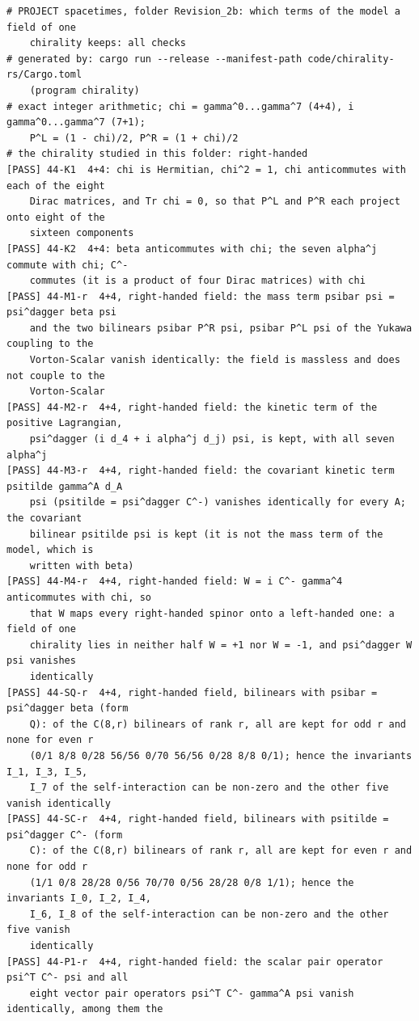 \documentclass[
  10pt,
]{article}
\begin{document}
\begin{verbatim}
# PROJECT spacetimes, folder Revision_2b: which terms of the model a field of one
    chirality keeps: all checks
# generated by: cargo run --release --manifest-path code/chirality-rs/Cargo.toml
    (program chirality)
# exact integer arithmetic; chi = gamma^0...gamma^7 (4+4), i gamma^0...gamma^7 (7+1);
    P^L = (1 - chi)/2, P^R = (1 + chi)/2
# the chirality studied in this folder: right-handed
[PASS] 44-K1  4+4: chi is Hermitian, chi^2 = 1, chi anticommutes with each of the eight
    Dirac matrices, and Tr chi = 0, so that P^L and P^R each project onto eight of the
    sixteen components
[PASS] 44-K2  4+4: beta anticommutes with chi; the seven alpha^j commute with chi; C^-
    commutes (it is a product of four Dirac matrices) with chi
[PASS] 44-M1-r  4+4, right-handed field: the mass term psibar psi = psi^dagger beta psi
    and the two bilinears psibar P^R psi, psibar P^L psi of the Yukawa coupling to the
    Vorton-Scalar vanish identically: the field is massless and does not couple to the
    Vorton-Scalar
[PASS] 44-M2-r  4+4, right-handed field: the kinetic term of the positive Lagrangian,
    psi^dagger (i d_4 + i alpha^j d_j) psi, is kept, with all seven alpha^j
[PASS] 44-M3-r  4+4, right-handed field: the covariant kinetic term psitilde gamma^A d_A
    psi (psitilde = psi^dagger C^-) vanishes identically for every A; the covariant
    bilinear psitilde psi is kept (it is not the mass term of the model, which is
    written with beta)
[PASS] 44-M4-r  4+4, right-handed field: W = i C^- gamma^4 anticommutes with chi, so
    that W maps every right-handed spinor onto a left-handed one: a field of one
    chirality lies in neither half W = +1 nor W = -1, and psi^dagger W psi vanishes
    identically
[PASS] 44-SQ-r  4+4, right-handed field, bilinears with psibar = psi^dagger beta (form
    Q): of the C(8,r) bilinears of rank r, all are kept for odd r and none for even r
    (0/1 8/8 0/28 56/56 0/70 56/56 0/28 8/8 0/1); hence the invariants I_1, I_3, I_5,
    I_7 of the self-interaction can be non-zero and the other five vanish identically
[PASS] 44-SC-r  4+4, right-handed field, bilinears with psitilde = psi^dagger C^- (form
    C): of the C(8,r) bilinears of rank r, all are kept for even r and none for odd r
    (1/1 0/8 28/28 0/56 70/70 0/56 28/28 0/8 1/1); hence the invariants I_0, I_2, I_4,
    I_6, I_8 of the self-interaction can be non-zero and the other five vanish
    identically
[PASS] 44-P1-r  4+4, right-handed field: the scalar pair operator psi^T C^- psi and all
    eight vector pair operators psi^T C^- gamma^A psi vanish identically, among them the

\end{verbatim}
\end{document}
